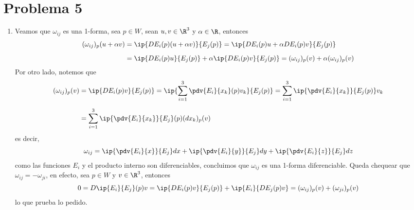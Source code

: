 \documentclass{article}
\begin{document}
\section*{Problema 5}
\begin{enumerate}
    \item Veamos que $\omega_{ij}$ es una 1-forma, sea $p\in W$, sean $u,v\in\R^{3}$ y 
    $\alpha\in\R$, entonces
    \begin{align*}
        (\omega_{ij})_{p}(u+\alpha v) &= \ip{DE_{i}(p)(u+\alpha v)}{E_{j}(p)}
        =\ip{DE_{i}(p)u+\alpha DE_{i}(p)v}{E_{j}(p)} \\[2mm]
        &= \ip{DE_{i}(p)u}{E_{j}(p)}+\alpha\ip{DE_{i}(p)v}{E_{j}(p)}
        =(\omega_{ij})_{p}(v)+\alpha(\omega_{ij})_{p}(v)
    \end{align*}
    Por otro lado, notemos que
    \begin{align*}
        (\omega_{ij})_{p}(v) &= \ip{DE_{i}(p)v}{E_{j}(p)}=\ip{\sum_{i=1}^{3}\pdv{E_{i}}
        {x_{k}}(p)v_{k}}{E_{j}(p)}=\sum_{i=1}^{3}\ip{\pdv{E_{i}}{x_{k}}}{E_{j}(p)}v_{k} \\[2mm]
        &= \sum_{i=1}^{3}\ip{\pdv{E_{i}}{x_{k}}}{E_{j}}(p)(dx_{k})_{p}(v)
    \end{align*}
    es decir,
    \begin{equation*}
        \omega_{ij}=\ip{\pdv{E_{i}}{x}}{E_{j}}dx+\ip{\pdv{E_{i}}{y}}{E_{j}}dy
        +\ip{\pdv{E_{i}}{z}}{E_{j}}dz
    \end{equation*}
    como las funciones $E_{i}$ y el producto interno son diferenciables, concluimos que 
    $\omega_{ij}$ es una 1-forma diferenciable. Queda chequear que $\omega_{ij}=-\omega_{ji}$, en
    efecto, sea $p\in W$ y $v\in\R^{3}$, entonces
    \begin{equation*}
        0=D\ip{E_{i}}{E_{j}}(p)v=\ip{DE_{i}(p)v}{E_{j}(p)}+\ip{E_{i}}{DE_{j}(p)v}
        =(\omega_{ij})_{p}(v)+(\omega_{ji})_{p}(v)
    \end{equation*}
    lo que prueba lo pedido.
    

\end{enumerate}
\end{document}
